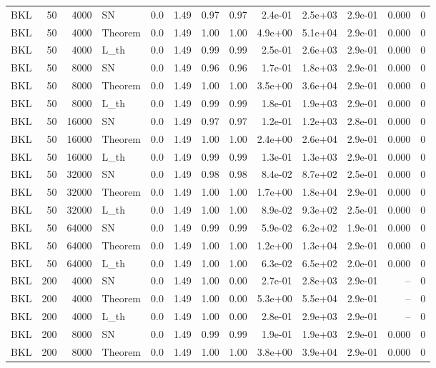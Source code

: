 \begin{tabular}{lrrlrrrrrrrrr}
BKL & 50 & 4000 & SN & 0.0 & 1.49 & 0.97 & 0.97 & 2.4e-01 & 2.5e+03 & 2.9e-01 & 0.000 & 0 \\
BKL & 50 & 4000 & Theorem & 0.0 & 1.49 & 1.00 & 1.00 & 4.9e+00 & 5.1e+04 & 2.9e-01 & 0.000 & 0 \\
BKL & 50 & 4000 & L\_th & 0.0 & 1.49 & 0.99 & 0.99 & 2.5e-01 & 2.6e+03 & 2.9e-01 & 0.000 & 0 \\
BKL & 50 & 8000 & SN & 0.0 & 1.49 & 0.96 & 0.96 & 1.7e-01 & 1.8e+03 & 2.9e-01 & 0.000 & 0 \\
BKL & 50 & 8000 & Theorem & 0.0 & 1.49 & 1.00 & 1.00 & 3.5e+00 & 3.6e+04 & 2.9e-01 & 0.000 & 0 \\
BKL & 50 & 8000 & L\_th & 0.0 & 1.49 & 0.99 & 0.99 & 1.8e-01 & 1.9e+03 & 2.9e-01 & 0.000 & 0 \\
BKL & 50 & 16000 & SN & 0.0 & 1.49 & 0.97 & 0.97 & 1.2e-01 & 1.2e+03 & 2.8e-01 & 0.000 & 0 \\
BKL & 50 & 16000 & Theorem & 0.0 & 1.49 & 1.00 & 1.00 & 2.4e+00 & 2.6e+04 & 2.9e-01 & 0.000 & 0 \\
BKL & 50 & 16000 & L\_th & 0.0 & 1.49 & 0.99 & 0.99 & 1.3e-01 & 1.3e+03 & 2.9e-01 & 0.000 & 0 \\
BKL & 50 & 32000 & SN & 0.0 & 1.49 & 0.98 & 0.98 & 8.4e-02 & 8.7e+02 & 2.5e-01 & 0.000 & 0 \\
BKL & 50 & 32000 & Theorem & 0.0 & 1.49 & 1.00 & 1.00 & 1.7e+00 & 1.8e+04 & 2.9e-01 & 0.000 & 0 \\
BKL & 50 & 32000 & L\_th & 0.0 & 1.49 & 1.00 & 1.00 & 8.9e-02 & 9.3e+02 & 2.5e-01 & 0.000 & 0 \\
BKL & 50 & 64000 & SN & 0.0 & 1.49 & 0.99 & 0.99 & 5.9e-02 & 6.2e+02 & 1.9e-01 & 0.000 & 0 \\
BKL & 50 & 64000 & Theorem & 0.0 & 1.49 & 1.00 & 1.00 & 1.2e+00 & 1.3e+04 & 2.9e-01 & 0.000 & 0 \\
BKL & 50 & 64000 & L\_th & 0.0 & 1.49 & 1.00 & 1.00 & 6.3e-02 & 6.5e+02 & 2.0e-01 & 0.000 & 0 \\
BKL & 200 & 4000 & SN & 0.0 & 1.49 & 1.00 & 0.00 & 2.7e-01 & 2.8e+03 & 2.9e-01 & -- & 0 \\
BKL & 200 & 4000 & Theorem & 0.0 & 1.49 & 1.00 & 0.00 & 5.3e+00 & 5.5e+04 & 2.9e-01 & -- & 0 \\
BKL & 200 & 4000 & L\_th & 0.0 & 1.49 & 1.00 & 0.00 & 2.8e-01 & 2.9e+03 & 2.9e-01 & -- & 0 \\
BKL & 200 & 8000 & SN & 0.0 & 1.49 & 0.99 & 0.99 & 1.9e-01 & 1.9e+03 & 2.9e-01 & 0.000 & 0 \\
BKL & 200 & 8000 & Theorem & 0.0 & 1.49 & 1.00 & 1.00 & 3.8e+00 & 3.9e+04 & 2.9e-01 & 0.000 & 0 \\

\end{tabular}
